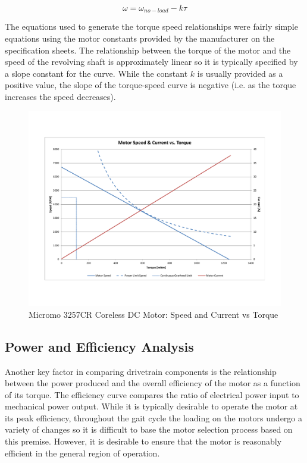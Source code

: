 \begin{equation}
	\omega = \omega_{no-load} - k\tau
\end{equation}

The equations used to generate the torque speed relationships were fairly simple equations using the motor constants provided by the manufacturer on the specification sheets. The relationship between the torque of the motor and the speed of the revolving shaft is approximately linear so it is typically specified by a slope constant for the curve. While the constant $k$ is usually provided as a positive value, the slope of the torque-speed curve is negative (i.e. as the torque increases the speed decreases). 

\begin{figure}[!ht]
	\begin{center}
    \includegraphics[scale=0.6]{fig/design/motor1.pdf}
	\end{center}
  \caption{Micromo 3257CR Coreless DC Motor: Speed and Current vs Torque}
\end{figure}


\subsection{Power and Efficiency Analysis} %
\label{sub:power_and_efficiency_analysis}
Another key factor in comparing drivetrain components is the relationship between the power produced and the overall efficiency of the motor as a function of its torque. The efficiency curve compares the ratio of electrical power input to mechanical power output. While it is typically desirable to operate the motor at its peak efficiency, throughout the gait cycle the loading on the motors undergo a variety of changes so it is difficult to base the motor selection process based on this premise. However, it is desirable to ensure that the motor is reasonably efficient in the general region of operation. 


